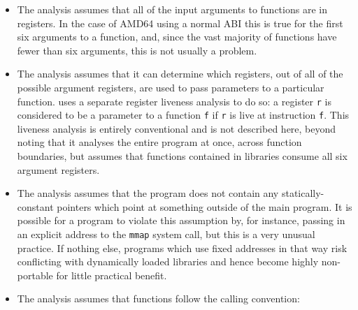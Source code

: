 \begin{itemize}
\item
  The analysis assumes that all of the input arguments to functions
  are in registers.  In the case of AMD64 using a normal ABI this is
  true for the first six arguments to a function, and, since the vast
  majority of functions have fewer than six arguments, this is not
  usually a problem.  

\item
  The analysis assumes that it can determine which registers, out of
  all of the possible argument registers, are used to pass parameters
  to a particular function.  {\Implementation} uses a separate
  register liveness analysis to do so: a register \verb|r| is
  considered to be a parameter to a function \verb|f| if \verb|r| is
  live at instruction \verb|f|.  This liveness analysis is entirely
  conventional and is not described here, beyond noting that it
  analyses the entire program at once, across function boundaries, but
  assumes that functions contained in libraries consume all six
  argument registers.

\item
  The analysis assumes that the program does not contain any
  statically-constant pointers which point at something outside of the
  main program.  It is possible for a program to violate this
  assumption by, for instance, passing in an explicit address to the
  \verb|mmap| system call, but this is a very unusual practice.  If
  nothing else, programs which use fixed addresses in that way risk
  conflicting with dynamically loaded libraries and hence become
  highly non-portable for little practical benefit.

\item
  The analysis assumes that functions follow the calling convention:


\end{itemize}
